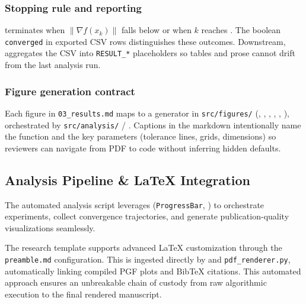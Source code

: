 \documentclass[
  english,
]{article}
\begin{document}
\subsubsection{Stopping rule and
reporting}\label{stopping-rule-and-reporting}

 terminates when \(\|\nabla f(x_k)\|\) falls
below  or when \(k\) reaches
. The boolean \texttt{converged} in
exported CSV rows distinguishes these outcomes. Downstream,
 aggregates the
CSV into \texttt{RESULT\_*} placeholders so tables and prose cannot
drift from the last analysis run.

\subsubsection{Figure generation
contract}\label{figure-generation-contract}

Each figure in \texttt{03\_results.md} maps to a generator in
\texttt{src/figures/} (,
,
,
,
,
), orchestrated by
\texttt{src/analysis/} / .
Captions in the markdown intentionally name the function and the key
parameters (tolerance lines, grids, dimensions) so reviewers can
navigate from PDF to code without inferring hidden defaults.

\subsection{Analysis Pipeline \& LaTeX
Integration}\label{analysis-pipeline-latex-integration}

The automated analysis script leverages
\href{https://github.com/docxology/template/blob/main/infrastructure/core/progress.py}{}
(\texttt{ProgressBar}, ) to orchestrate
experiments, collect convergence trajectories, and generate
publication-quality visualizations seamlessly.

The research template supports advanced LaTeX customization through the
\texttt{preamble.md} configuration. This is ingested directly by
 and
\texttt{pdf\_renderer.py}, automatically linking compiled PGF plots and
BibTeX citations. This automated approach ensures an unbreakable chain
of custody from raw algorithmic execution to the final rendered
manuscript.
\end{document}
